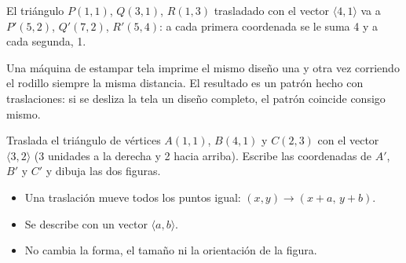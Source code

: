 \documentclass[11pt]{article}
\begin{document}
\begin{ejemplo}
El triángulo $P(1, 1)$, $Q(3, 1)$, $R(1, 3)$ trasladado con el vector $\langle 4, 1\rangle$ va a
$P'(5, 2)$, $Q'(7, 2)$, $R'(5, 4)$: a cada primera coordenada se le suma 4 y a cada segunda, 1.

\begin{center}
\end{center}
\end{ejemplo}

\begin{aplicacion}
Una máquina de estampar tela imprime el mismo diseño una y otra vez corriendo el rodillo siempre
la misma distancia. El resultado es un patrón hecho con traslaciones: si se desliza la tela un
diseño completo, el patrón coincide consigo mismo.
\end{aplicacion}

\begin{preguntas}
\pregunta Traslada el triángulo de vértices $A(1, 1)$, $B(4, 1)$ y $C(2, 3)$ con el vector
$\langle 3, 2 \rangle$ (3 unidades a la derecha y 2 hacia arriba). Escribe las coordenadas de
$A'$, $B'$ y $C'$ y dibuja las dos figuras.
\espacio{4cm}
\end{preguntas}

\begin{resumen}
\begin{itemize}
  \item Una traslación mueve todos los puntos igual: $(x, y) \to (x + a,\, y + b)$.
  \item Se describe con un vector $\langle a, b\rangle$.
  \item No cambia la forma, el tamaño ni la orientación de la figura.
\end{itemize}
\end{resumen}

\label{tema:rotaciones}
\end{document}
